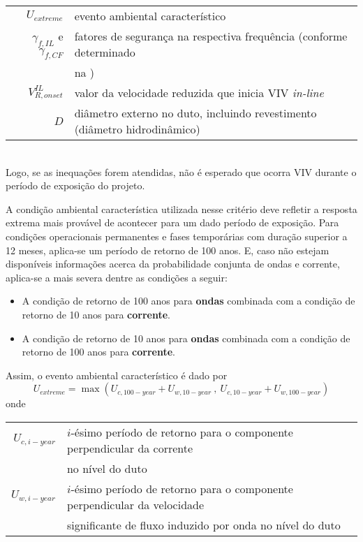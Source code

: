 \begin{tabular}{rl}
	$U_\mathit{extreme}$                                  & evento ambiental característico\\
	$\gamma_{f,\mathit{IL}}$  e  $\gamma_{f,\mathit{CF}}$ & fatores de segurança na respectiva frequência (conforme determinado \\
 	                                                      & na \dnvf105)\\
	$V_{R,\mathit{onset}}^\mathit{IL}$                    & valor da velocidade reduzida que inicia VIV \textit{in-line}\\
	$D$                                                   & diâmetro externo no duto, incluindo revestimento (diâmetro hidrodinâmico)\\
\end{tabular}\\
Logo, se as inequações forem atendidas, não é esperado que ocorra VIV durante o período de exposição do projeto.


A condição ambiental característica utilizada nesse critério deve refletir a resposta extrema mais provável de acontecer para um dado período de exposição. Para condições operacionais permanentes e fases temporárias com duração superior a 12 meses, aplica-se um período de retorno de 100 anos. E, caso não estejam disponíveis informações acerca da probabilidade conjunta de ondas e corrente, aplica-se a mais severa dentre as condições a seguir:
\begin{itemize}
\item A condição de retorno de 100 anos para \textbf{ondas} combinada com a condição de retorno de 10 anos para \textbf{corrente}.
\item A condição de retorno de 10 anos para \textbf{ondas} combinada com a condição de retorno de 100 anos para \textbf{corrente}.
\end{itemize}
Assim, o evento ambiental característico é dado por
\begin{equation}
U_\mathit{extreme} = \max\left( U_{c,100-\mathit{year}} + U_{w,10-\mathit{year}} ~,~ U_{c,10-\mathit{year}} + U_{w,100-\mathit{year}} \right)
\end{equation}
onde

\begin{tabular}{rl}
$U_{c,i-\mathit{year}}$ & $i$-ésimo período de retorno para o componente perpendicular da corrente \\
                        & no nível do duto\\
$U_{w,i-\mathit{year}}$ & $i$-ésimo período de retorno para o componente perpendicular da velocidade \\
                        & significante de fluxo induzido por onda no nível do duto
\end{tabular}


